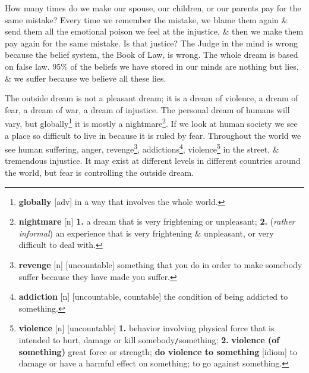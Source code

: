 \documentclass[oneside]{book}
\numberwithin{equation}{section}
\begin{document}
How many times do we make our spouse, our children, or our parents pay for the same mistake? Every time we remember the mistake, we blame them again \& send them all the emotional poison we feel at the injustice, \& then we make them pay again for the same mistake. Is that justice? The Judge in the mind is wrong because the belief system, the Book of Law, is wrong. The whole dream is based on false law. 95\% of the beliefs we have stored in our minds are nothing but lies, \& we suffer because we believe all these lies.

 The outside dream is not a pleasant dream; it is a dream of violence, a dream of fear, a dream of war, a dream of injustice. The personal dream of humans will vary, but globally\footnote{\textbf{globally} [adv] in a way that involves the whole world.} it is mostly a nightmare\footnote{\textbf{nightmare} [n] \textbf{1.} a dream that is very frightening or unpleasant; \textbf{2.} (\textit{rather informal}) an experience that is very frightening \& unpleasant, or very difficult to deal with.}. If we look at human society we see a place so difficult to live in because it is ruled by fear. Throughout the world we see human suffering, anger, revenge\footnote{\textbf{revenge} [n] [uncountable] something that you do in order to make somebody suffer because they have made you suffer.}, addictions\footnote{\textbf{addiction} [n] [uncountable, countable] the condition of being addicted to something.}, violence\footnote{\textbf{violence} [n] [uncountable] \textbf{1.} behavior involving physical force that is intended to hurt, damage or kill somebody\texttt{/}something; \textbf{2.} \textbf{violence (of something)} great force or strength; \textbf{do violence to something} [idiom] to damage or have a harmful effect on something; to go against something.} in the street, \& tremendous injustice. It may exist at different levels in different countries around the world, but fear is controlling the outside dream.
\end{document}
